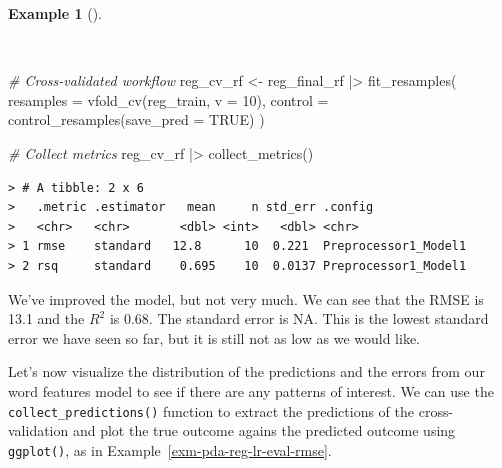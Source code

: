 \documentclass[
  letterpaper,
  DIV=11,
  numbers=noendperiod]{scrreprt}
\newenvironment{Shaded}{\begin{snugshade}}{\end{snugshade}}
\newcommand{\AttributeTok}[1]{\textcolor[rgb]{0.00,0.00,0.00}{#1}}
\newcommand{\CommentTok}[1]{\textcolor[rgb]{0.00,0.00,0.00}{\textit{#1}}}
\newcommand{\ConstantTok}[1]{\textcolor[rgb]{0.00,0.00,0.00}{#1}}
\newcommand{\DecValTok}[1]{\textcolor[rgb]{0.00,0.00,0.00}{#1}}
\newcommand{\FunctionTok}[1]{\textcolor[rgb]{0.00,0.00,0.00}{#1}}
\newcommand{\NormalTok}[1]{\textcolor[rgb]{0.00,0.00,0.00}{#1}}
\newcommand{\OtherTok}[1]{\textcolor[rgb]{0.00,0.00,0.00}{#1}}
\newcommand{\SpecialCharTok}[1]{\textcolor[rgb]{0.00,0.00,0.00}{#1}}
\theoremstyle{definition}
\newtheorem{example}{Example}[chapter]
\theoremstyle{remark}
\begin{document}
\begin{example}[]\protect\hypertarget{exm-pda-reg-model-spec-random-forest-workflow-tune-select-fit-evaluate}{}\label{exm-pda-reg-model-spec-random-forest-workflow-tune-select-fit-evaluate}

~

\begin{Shaded}
\begin{Highlighting}[]
\CommentTok{\# Cross{-}validated workflow}
\NormalTok{reg\_cv\_rf }\OtherTok{\textless{}{-}}
\NormalTok{  reg\_final\_rf }\SpecialCharTok{|\textgreater{}}
  \FunctionTok{fit\_resamples}\NormalTok{(}
    \AttributeTok{resamples =} \FunctionTok{vfold\_cv}\NormalTok{(reg\_train, }\AttributeTok{v =} \DecValTok{10}\NormalTok{),}
    \AttributeTok{control =} \FunctionTok{control\_resamples}\NormalTok{(}\AttributeTok{save\_pred =} \ConstantTok{TRUE}\NormalTok{)}
\NormalTok{  )}

\CommentTok{\# Collect metrics}
\NormalTok{reg\_cv\_rf }\SpecialCharTok{|\textgreater{}}
  \FunctionTok{collect\_metrics}\NormalTok{()}
\end{Highlighting}
\end{Shaded}

\begin{verbatim}
> # A tibble: 2 x 6
>   .metric .estimator   mean     n std_err .config             
>   <chr>   <chr>       <dbl> <int>   <dbl> <chr>               
> 1 rmse    standard   12.8      10  0.221  Preprocessor1_Model1
> 2 rsq     standard    0.695    10  0.0137 Preprocessor1_Model1
\end{verbatim}

\end{example}

We've improved the model, but not very much. We can see that the RMSE is
13.1 and the \(R^2\) is 0.68. The standard error is NA. This is the
lowest standard error we have seen so far, but it is still not as low as
we would like.

Let's now visualize the distribution of the predictions and the errors
from our word features model to see if there are any patterns of
interest. We can use the \texttt{collect\_predictions()} function to
extract the predictions of the cross-validation and plot the true
outcome agains the predicted outcome using \texttt{ggplot()}, as in
Example~\ref{exm-pda-reg-lr-eval-rmse}.
\end{document}
